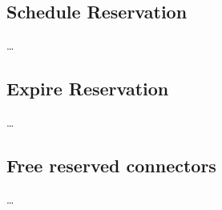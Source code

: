 \subsection{Schedule Reservation}
\label{ch:Implementation:sec:Implemented Use Cases:ssec:Schedule Reservation}

\dots


\subsection{Expire Reservation}
\label{ch:Implementation:sec:Implemented Use Cases:ssec:Expire Reservation}

\dots

\subsection{Free reserved connectors}
\label{ch:Implementation:sec:Implemented Use Cases:ssec:Free reserved connectors}

\dots


